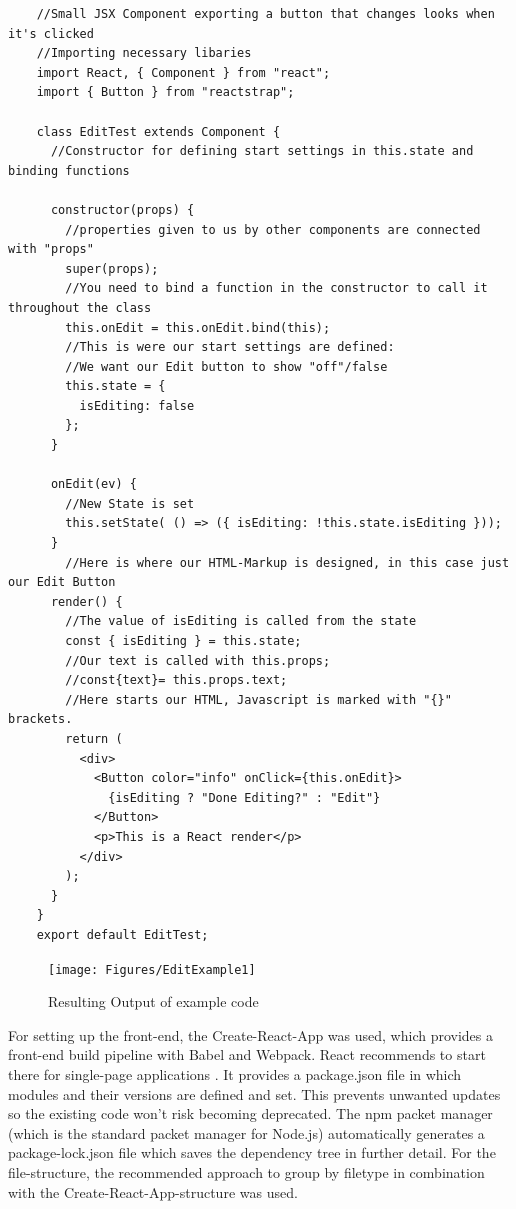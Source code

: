 \newpage
\begin{lstlisting}
	//Small JSX Component exporting a button that changes looks when it's clicked
	//Importing necessary libaries
	import React, { Component } from "react";
	import { Button } from "reactstrap";
	
	class EditTest extends Component {
	  //Constructor for defining start settings in this.state and binding functions
	
	  constructor(props) {
		//properties given to us by other components are connected with "props"
		super(props);
		//You need to bind a function in the constructor to call it throughout the class
		this.onEdit = this.onEdit.bind(this);
		//This is were our start settings are defined:
		//We want our Edit button to show "off"/false
		this.state = {
		  isEditing: false
		};
	  }
	
	  onEdit(ev) {
		//New State is set
		this.setState( () => ({ isEditing: !this.state.isEditing }));
	  }
		//Here is where our HTML-Markup is designed, in this case just our Edit Button
	  render() {
		//The value of isEditing is called from the state
		const { isEditing } = this.state;
		//Our text is called with this.props;
		//const{text}= this.props.text;
		//Here starts our HTML, Javascript is marked with "{}" brackets.
		return (
		  <div>
			<Button color="info" onClick={this.onEdit}>
			  {isEditing ? "Done Editing?" : "Edit"}
			</Button>
			<p>This is a React render</p>
		  </div>
		);
	  }
	}	
	export default EditTest;	
\end{lstlisting}
\begin{figure}[t]
    \centering
	\texttt{[image: Figures/EditExample1]}
	\decoRule
	\caption[ReactEx]{Resulting Output of example code}
	\label{fig:resultReact}
\end{figure}

For setting up the front-end, the Create-React-App was used, which provides a front-end build pipeline with Babel and Webpack.
React recommends to start there for single-page applications \parencite{createReactApp}.
It provides a package.json file in which modules and their versions are defined and set.
This prevents unwanted updates so the existing code won't risk becoming deprecated.
The npm packet manager (which is the standard packet manager for Node.js) automatically generates a package-lock.json file which saves the dependency tree in further detail.
For the file-structure, the recommended approach to group by filetype \parencite{reactStructure} in combination with the Create-React-App-structure was used.

